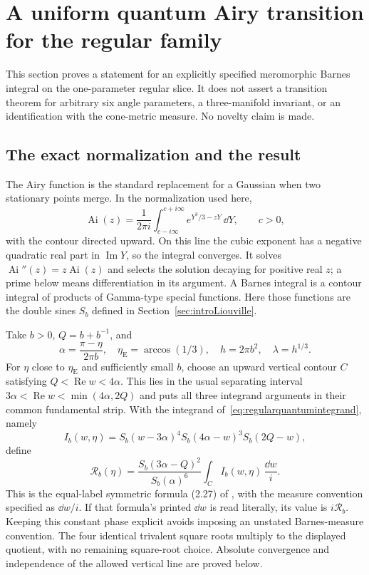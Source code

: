 \section{A uniform quantum Airy transition for the regular family}
\label{sec:quantumAiry}

This section proves a statement for an explicitly specified
meromorphic Barnes integral on the one-parameter regular slice.
It does not assert a transition theorem for arbitrary six angle
parameters, a three-manifold invariant, or an identification with
the cone-metric measure. No novelty claim is made.

\subsection{The exact normalization and the result}

The Airy function is the standard replacement for a Gaussian when
two stationary points merge. In the normalization used here,
\[
 \operatorname{Ai}(z)=\frac1{2\pi i}
   \int_{c-i\infty}^{c+i\infty}e^{Y^3/3-zY}\,\dd Y,
 \qquad c>0,
\]
with the contour directed upward. On this line the cubic exponent
has a negative quadratic real part in $\operatorname{Im}Y$, so
the integral converges. It solves $\operatorname{Ai}''(z)=z
\operatorname{Ai}(z)$ and selects the solution decaying for
positive real $z$; a prime below means differentiation in its argument.
A Barnes integral is a contour integral of products of Gamma-type
special functions. Here those functions are the double sines
$S_b$ defined in Section~\ref{sec:introLiouville}.

Take $b>0$, $Q=b+b^{-1}$, and
\[
 \alpha=\frac{\pi-\eta}{2\pi b},\quad
 \eta_{\mathrm E}=\arccos(1/3),\quad
 h=2\pi b^2,\quad \lambda=h^{1/3}.
\]
For $\eta$ close to $\eta_{\mathrm E}$ and sufficiently small $b$,
choose an upward vertical contour $C$ satisfying
$Q<\operatorname{Re}w<4\alpha$. This lies in the usual separating
interval $3\alpha<\operatorname{Re}w<\min(4\alpha,2Q)$ and puts
all three integrand arguments in their common fundamental strip.
With the integrand of~\eqref{eq:regularquantumintegrand}, namely
\[
 I_b(w,\eta)=S_b(w-3\alpha)^4
             S_b(4\alpha-w)^3S_b(2Q-w),
\]
define
\begin{equation}
 \mathcal R_b(\eta)=
 \frac{S_b(3\alpha-Q)^2}{S_b(\alpha)^6}
 \int_C I_b(w,\eta)\,\frac{\dd w}{i}.
 \label{eq:realregularsymbol}
\end{equation}
This is the equal-label symmetric formula (2.27) of
\cite[arXiv version~3]{TeschnerVartanov}, with the measure convention specified as
$\dd w/i$. If that formula's printed $\dd w$ is read literally,
its value is $i\mathcal R_b$. Keeping this constant phase explicit
avoids imposing an unstated Barnes-measure convention.
The four identical trivalent square roots multiply to the displayed
quotient, with no remaining square-root choice. Absolute convergence
and independence of the allowed vertical line are proved below.

